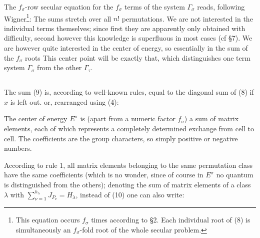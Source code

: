 \begin{paper}{1}
The $f_\sigma$-row secular equation for the $f_\sigma$ terms of the system $\Gamma_\sigma$ reads, following Wigner\footnote{This equation occurs $f_\sigma$ times according to \S2. Each individual root of (8) is simultaneously an $f_\sigma$-fold root of the whole secular problem.}:
The sums stretch over all $n!$ permutations. We are not interested in the individual terms themselves; since first they are apparently only obtained with difficulty, second however this knowledge is superfluous in most cases (cf \S7). We are however quite interested in the center of energy, so essentially in the sum of the $f_\sigma$ roots
This center point will be exactly that, which distinguishes one term system $\Gamma_\sigma$ from the other $\Gamma_\tau$.

\subsection{} The sum (9) is, according to well-known rules, equal to the diagonal sum of (8) if $x$ is left out.
or, rearranged using (4):

The center of energy $E^\sigma$ is (apart from a numeric factor $f_\sigma$) a sum of matrix elements, each of which represents a completely determined exchange from cell to cell. The coefficients are the group characters, so simply positive or negative numbers.

According to rule 1, all matrix elements belonging to the same permutation class have the same coefficients (which is no wonder, since of course in $E^\sigma$ no quantum is distinguished from the others); denoting the sum of matrix elements of a class $\lambda$ with $\sum\limits_{\nu=1}^{h_\lambda} J_{P_\nu} = H_\lambda$, instead of (10) one can also write:


\end{paper}
